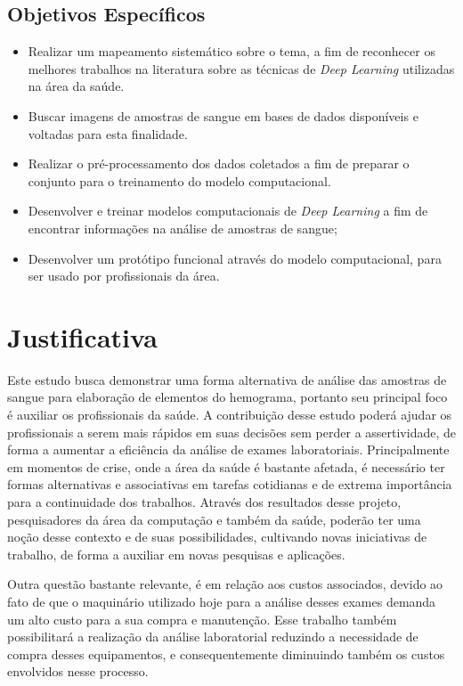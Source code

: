 \subsection{Objetivos Específicos}
\begin{itemize}
    \item Realizar um mapeamento sistemático sobre o tema, a fim de reconhecer os melhores trabalhos na literatura sobre as técnicas de \emph{Deep Learning} utilizadas na área da saúde.
    \item Buscar imagens de amostras de sangue em bases de dados disponíveis e voltadas para esta finalidade.
    \item Realizar o pré-processamento dos dados coletados a fim de preparar o conjunto para o treinamento do modelo computacional.
    \item Desenvolver e treinar modelos computacionais de \emph{Deep Learning} a fim de encontrar informações na análise de amostras de sangue;
    \item Desenvolver um protótipo funcional através do modelo computacional, para ser usado por profissionais da área.
\end{itemize}

\section{Justificativa}
\label{sec:justificativa}
Este estudo busca demonstrar uma forma alternativa de análise das amostras de sangue para elaboração de elementos do hemograma, portanto seu principal foco é auxiliar os profissionais da saúde. A contribuição desse estudo poderá ajudar os profissionais a serem mais rápidos em suas decisões sem perder a assertividade, de forma a aumentar a eficiência da análise de exames laboratoriais. Principalmente em momentos de crise, onde a área da saúde é bastante afetada, é necessário ter formas alternativas e associativas em tarefas cotidianas e de extrema importância para a continuidade dos trabalhos. Através dos resultados desse projeto, pesquisadores da área da computação e também da saúde, poderão ter uma noção desse contexto e de suas possibilidades, cultivando novas iniciativas de trabalho, de forma a auxiliar em novas pesquisas e aplicações.

Outra questão bastante relevante, é em relação aos custos associados, devido ao fato de que o maquinário utilizado hoje para a análise desses exames demanda um alto custo para a sua compra e manutenção. Esse trabalho também possibilitará a realização da análise laboratorial reduzindo a necessidade de compra desses equipamentos, e consequentemente diminuindo também os custos envolvidos nesse processo.

